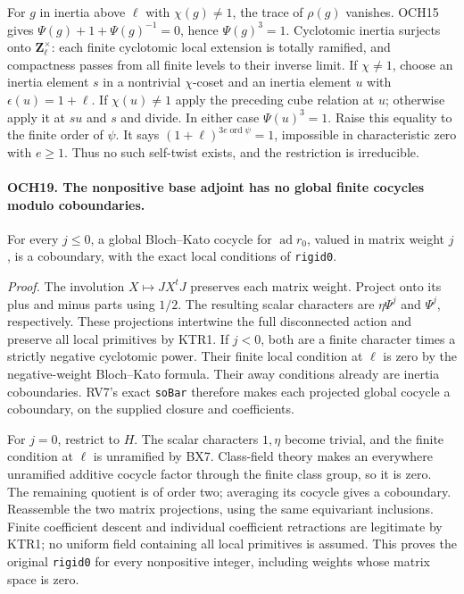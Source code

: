 \documentclass[11pt,a4paper]{article}
\numberwithin{equation}{section}
\theoremstyle{remark}\newtheorem{remark}[theorem]{Remark}
\begin{document}
For \(g\) in inertia above \(\ell\) with \(\chi(g)\ne1\),
the trace of \(\rho(g)\) vanishes.  OCH15 gives
\(\Psi(g)+1+\Psi(g)^{-1}=0\), hence \(\Psi(g)^3=1\).
Cyclotomic inertia surjects onto \(\mathbf Z_\ell^\times\):
each finite cyclotomic local extension is totally ramified, and
compactness passes from all finite levels to their inverse limit.
If \(\chi\ne1\), choose an inertia element \(s\) in a
nontrivial \(\chi\)-coset and an inertia element \(u\) with
\(\epsilon(u)=1+\ell\).  If \(\chi(u)\ne1\) apply the
preceding cube relation at \(u\); otherwise apply it at \(su\)
and \(s\) and divide.  In either case \(\Psi(u)^3=1\).
Raise this equality to the finite order of \(\psi\).  It says
\((1+\ell)^{3e\operatorname{ord}\psi}=1\), impossible
in characteristic zero with \(e\ge1\).  Thus no such
self-twist exists, and the restriction is irreducible.

\paragraph{OCH19. The nonpositive base adjoint has no global finite cocycles modulo coboundaries.}
\label{claim:OCH19}
For every \(j\le0\), a global Bloch--Kato cocycle for
\(\operatorname{ad}r_0\), valued in matrix weight \(j\),
is a coboundary, with the exact local conditions of \texttt{rigid0}.

\emph{Proof.}
The involution \(X\mapsto JX^tJ\) preserves each matrix
weight.  Project onto its plus and minus parts using \(1/2\).
The resulting scalar characters are \(\eta\Psi^j\) and
\(\Psi^j\), respectively.  These projections intertwine the
full disconnected action and preserve all local primitives by
KTR1.  If \(j<0\), both are a finite character times a
strictly negative cyclotomic power.  Their finite local condition
at \(\ell\) is zero by the negative-weight Bloch--Kato
formula.  Their away conditions already are inertia coboundaries.
RV7's exact \texttt{so\allowbreak Bar} therefore makes each projected global
cocycle a coboundary, on the supplied closure and coefficients.

For \(j=0\), restrict to \(H\).  The scalar characters
\(1,\eta\) become trivial, and the finite condition at
\(\ell\) is unramified by BX7.  Class-field theory makes an
everywhere unramified additive cocycle factor through the finite
class group, so it is zero.  The remaining quotient is of order
two; averaging its cocycle gives a coboundary.  Reassemble the two
matrix projections, using the same equivariant inclusions.
Finite coefficient descent and individual coefficient retractions
are legitimate by KTR1; no uniform field containing all local
primitives is assumed.  This proves the original \texttt{rigid0}
for every nonpositive integer, including weights whose matrix
space is zero.
\end{document}
